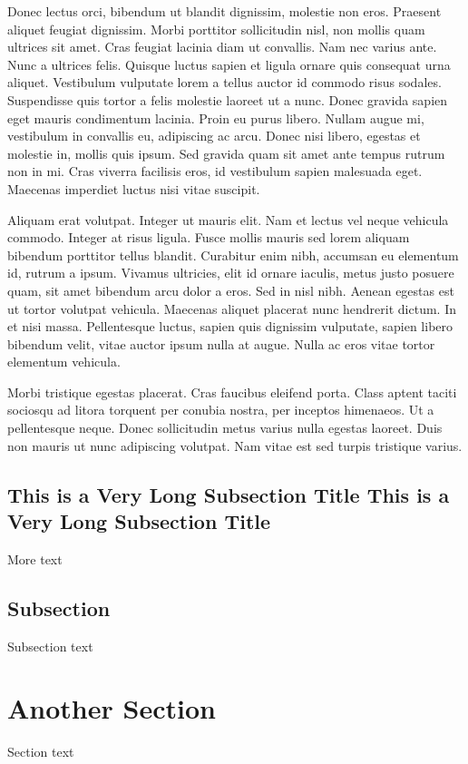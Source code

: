 Donec lectus orci, bibendum ut blandit dignissim, molestie non eros. Praesent aliquet feugiat dignissim. Morbi porttitor sollicitudin nisl, non mollis quam ultrices sit amet. Cras feugiat lacinia diam ut convallis. Nam nec varius ante. Nunc a ultrices felis. Quisque luctus sapien et ligula ornare quis consequat urna aliquet. Vestibulum vulputate lorem a tellus auctor id commodo risus sodales. Suspendisse quis tortor a felis molestie laoreet ut a nunc. Donec gravida sapien eget mauris condimentum lacinia. Proin eu purus libero. Nullam augue mi, vestibulum in convallis eu, adipiscing ac arcu. Donec nisi libero, egestas et molestie in, mollis quis ipsum. Sed gravida quam sit amet ante tempus rutrum non in mi. Cras viverra facilisis eros, id vestibulum sapien malesuada eget. Maecenas imperdiet luctus nisi vitae suscipit.



Aliquam erat volutpat. Integer ut mauris elit. Nam et lectus vel neque vehicula commodo. Integer at risus ligula. Fusce mollis mauris sed lorem aliquam bibendum porttitor tellus blandit. Curabitur enim nibh, accumsan eu elementum id, rutrum a ipsum. Vivamus ultricies, elit id ornare iaculis, metus justo posuere quam, sit amet bibendum arcu dolor a eros. Sed in nisl nibh. Aenean egestas est ut tortor volutpat vehicula. Maecenas aliquet placerat nunc hendrerit dictum. In et nisi massa. Pellentesque luctus, sapien quis dignissim vulputate, sapien libero bibendum velit, vitae auctor ipsum nulla at augue. Nulla ac eros vitae tortor elementum vehicula.

Morbi tristique egestas placerat. Cras faucibus eleifend porta. Class aptent taciti sociosqu ad litora torquent per conubia nostra, per inceptos himenaeos. Ut a pellentesque neque. Donec sollicitudin metus varius nulla egestas laoreet. Duis non mauris ut nunc adipiscing volutpat. Nam vitae est sed turpis tristique varius. 

\subsection{This is a Very Long Subsection Title This is a Very Long Subsection Title}

More text
\subsection{Subsection}

Subsection text

\section{Another Section}

Section text
